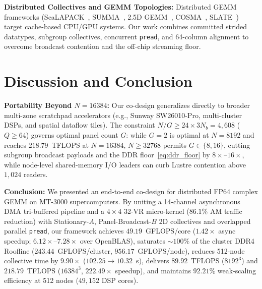 \documentclass[conference]{IEEEtran}
\begin{document}
\textbf{Distributed Collectives and GEMM Topologies:} Distributed GEMM frameworks (ScaLAPACK~\cite{choi1996scalapack}, SUMMA~\cite{vandegeijn1997summa}, 2.5D GEMM~\cite{solomonik2011comm25d}, COSMA~\cite{kwasniewski2019cosma}, SLATE~\cite{gates2019slate}) target cache-based CPU/GPU systems. Our work combines committed strided datatypes, subgroup collectives, concurrent \texttt{pread}, and 64-column alignment to overcome broadcast contention and the off-chip streaming floor.

\section{Discussion and Conclusion}
\label{sec:conclusion}
\textbf{Portability Beyond $N=16384$:} Our co-design generalizes directly to broader multi-zone scratchpad accelerators (e.g., Sunway SW26010-Pro, multi-cluster DSPs, and spatial dataflow tiles). The constraint $N/G \ge 24 \times 3 N_b = 4{,}608$ ($Q \ge 64$) governs optimal panel count $G$: while $G=2$ is optimal at $N=8192$ and reaches $218.79$~TFLOPS at $N=16384$, $N \ge 32768$ permits $G \in \{8, 16\}$, cutting subgroup broadcast payloads and the DDR floor~\eqref{eq:ddr_floor} by $8\times$--$16\times$, while node-level shared-memory I/O leaders can curb Lustre contention above $1{,}024$ readers.

\textbf{Conclusion:} We presented an end-to-end co-design for distributed FP64 complex GEMM on MT-3000 supercomputers. By uniting a 14-channel asynchronous DMA tri-buffered pipeline and a $4 \times 4$ 32-VR micro-kernel ($86.1\%$ AM traffic reduction) with Stationary-$A$, Panel-Broadcast-$B$ 2D collectives and overlapped parallel \texttt{pread}, our framework achieves $49.19$~GFLOPS/core ($1.42\times$ async speedup; $6.12\times$--$7.28\times$ over OpenBLAS), saturates $\sim\!100\%$ of the cluster DDR4 Roofline ($243.44$~GFLOPS/cluster, $956.17$~GFLOPS/node), reduces 512-node collective time by $9.90\times$ ($102.25 \to 10.32$~s), delivers $89.92$~TFLOPS ($8192^3$) and $218.79$~TFLOPS ($16384^3$, $222.49\times$ speedup), and maintains $92.21\%$ weak-scaling efficiency at 512 nodes ($49{,}152$ DSP cores).

\clearpage
{}


\end{document}
